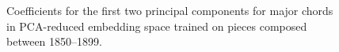 \begin{figure}
 \centerline{}
 \caption{Coefficients for the first two principal components for major chords in PCA-reduced embedding space trained on pieces composed between 1850--1899.}
 \label{fig:1850_majors}
\end{figure}

